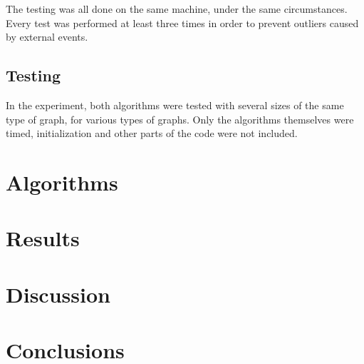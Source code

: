 \documentclass[twoside]{article}
\begin{document}
\begin{multicols}{2}
The testing was all done on the same machine, under the same circumstances. Every test was performed at least three times in order to prevent outliers caused by external events.

\subsection{Testing}
\label{methods:testing}
In the experiment, both algorithms were tested with several sizes of the same type of graph, for various types of graphs. 
Only the algorithms themselves were timed, initialization and other parts of the code were not included.

\section{Algorithms}
\label{algs}

\section{Results}
\label{results}


\section{Discussion} %
\label{disc}

\section{Conclusions}
\label{concl}

\label{references}
\printbibliography


\end{multicols}
\end{document}
